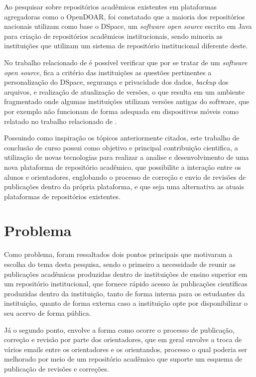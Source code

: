 Ao pesquisar sobre repositórios acadêmicos existentes em plataformas
agregadoras como o OpenDOAR, foi constatado que a maioria dos repositórios
nacionais utilizam como base o DSpace, um \emph{software open source}
escrito em Java para criação de repositórios acadêmicos institucionais,
sendo minoria as instituições que utilizam um sistema de repositório
institucional diferente deste.

No trabalho relacionado de \cite{GarciaRodrigoMoreira2019DdnB} é possível
verificar que por se tratar de um \emph{software open source},
fica a critério das instituições as questões pertinentes a personalização
do DSpace, segurança e privacidade dos dados, \emph{backup} dos arquivos,
e realização de atualização de versões, o que resulta em um ambiente
fragmentado onde algumas instituições utilizam versões antigas do software,
que por exemplo não funcionam de forma adequada em dispositivos móveis como
relatado no trabalho relacionado de \cite{FernandesMacedes:2018}.

Possuindo como inspiração os tópicos anteriormente citados,
este trabalho de conclusão de curso possui como objetivo e principal
contribuição cientifica, a utilização de novas tecnologias para realizar
a analise e desenvolvimento de uma nova plataforma de repositório
acadêmico, que possibilite a interação entre os alunos e orientadores,
englobando o processo de correção e envio de revisões de publicações
dentro da própria plataforma, e que seja uma alternativa as atuais
plataformas de repositórios existentes.

\section{Problema} \label{sec::Problem}

Como problema, foram ressaltados dois pontos principais que motivaram a escolha do tema desta pesquisa, sendo o primeiro a necessidade de reunir as publicações acadêmicas produzidas dentro de instituições de ensino superior em um repositório institucional, que fornece rápido acesso às publicações científicas produzidas dentro da instituição, tanto de forma interna para os estudantes da instituição, quanto de forma externa caso a instituição opte por disponibilizar o seu acervo de forma pública.

Já o segundo ponto, envolve a forma como ocorre o processo de publicação, correção e revisão por parte dos orientadores, que em geral envolve a troca de vários emails entre os orientadores e os orientandos, processo o qual poderia ser melhorado por meio de um repositório acadêmico que suporte um esquema de publicação de revisões e correções.

